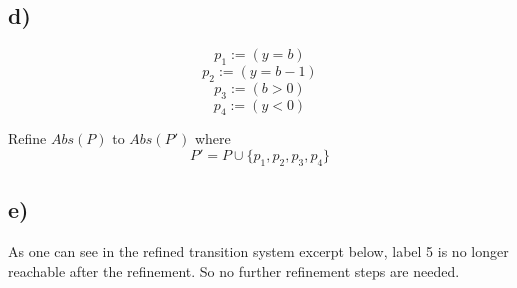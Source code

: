 \documentclass[fleqn,12pt]{article}
\begin{document}
\subsection*{d)}
$$p_1 := (y = b)$$
$$p_2 := (y = b - 1)$$
$$p_3 := (b>0)$$
$$p_4 := (y<0)$$

Refine $Abs(P)$ to $Abs(P')$ where
$$P' = P \cup \lbrace p_1,p_2,p_3,p_4 \rbrace $$
\subsection*{e)}
As one can see in the refined transition system excerpt below, label 5 is no longer reachable after the refinement. So no further refinement steps are needed.    
\end{document}
